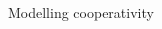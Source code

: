 \begin{frame}{Modelling cooperativity}
\begin{columns}
\begin{column}{0.6\textwidth}
\begin{figure}[ht]
{%
}
\label{fig:Hill}
\end{figure}
\end{column}
\end{columns}
\end{frame}

